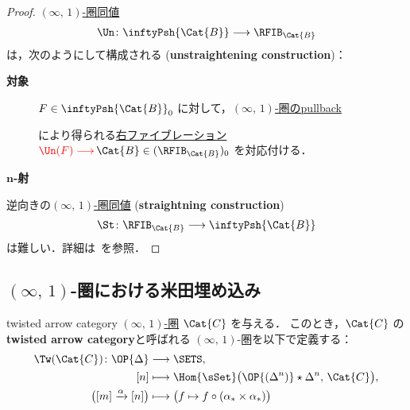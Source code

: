 \documentclass[TQFT_main]{subfiles}
\begin{document}
\begin{proof}
    \hyperref[def:equiv-infty]{$(\infty,\, 1)$-圏同値}
    \begin{align}
        \Un\colon \inftyPsh{\Cat{B}} \lto \RFIB_{\Cat{B}}
    \end{align}
    は，次のようにして構成される (\textbf{unstraightening construction})：
    \begin{description}
        \item[\textbf{対象}] 
        $F \in \inftyPsh{\Cat{B}}_0$ に対して，\hyperref[def:pullback-infty]{$(\infty,\, 1)$-圏のpullback}
        \begin{center}
        \end{center}
        により得られる\hyperref[def:infty-fib]{右ファイブレーション} $\textcolor{red}{\Un(F) \lto}\, \Cat{B} \in (\RFIB_{\Cat{B}}){}_0$ を対応付ける．
        \item[\textbf{$\bm{n}$-射}] 
    \end{description}
    逆向きの\hyperref[def:equiv-infty]{$(\infty,\, 1)$-圏同値} (\textbf{straightning construction})
    \begin{align}
        \St\colon \RFIB_{\Cat{B}} \lto \inftyPsh{\Cat{B}}
    \end{align}
    は難しい．詳細は~\cite[Proposition 2.2.3.11]{lurie2008higher}を参照．
\end{proof}

\subsection{{$(\infty,\, 1)$}-圏における米田埋め込み}

\begin{mydef}[label=def:Tw]{twisted arrow category}
    \hyperref[def:infinity-1]{$(\infty,\, 1)$-圏} $\Cat{C}$ を与える．
    このとき，$\Cat{C}$ の\textbf{twisted arrow category}と呼ばれる $(\infty,\, 1)$-圏を以下で定義する：
    \begin{align}
        \Tw(\Cat{C}) \colon \OP{\Delta} &\lto \SETS, \\
        [n] &\lmto \Hom{\sSet} \bigl( \OP{(\Delta^n)} \star \Delta^n,\, \Cat{C} \bigr), \\
        \bigl( [m] \xrightarrow{\alpha} [n] \bigr) &\lmto \bigl( f \mapsto f \circ (\alpha_* \times \alpha_*) \bigr) 
    \end{align}
\end{mydef}
\end{document}
